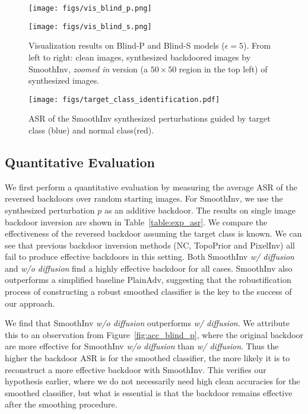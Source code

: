 \documentclass[10pt,twocolumn,letterpaper]{article}
\begin{document}
\begin{figure*}[htbp]
\centering 
        \begin{minipage}[]{0.495\linewidth}
        {\texttt{[image: figs/vis\_blind\_p.png]}}
        \end{minipage}
        \begin{minipage}[]{0.495\linewidth}
        {\texttt{[image: figs/vis\_blind\_s.png]}}
        \end{minipage}
    \caption{Visualization results on Blind-P and Blind-S models ($\epsilon=5$). From left to right: clean images, synthesized backdoored images by SmoothInv, \textit{zoomed in} version (a $50\times 50$ region in the top left) of synthesized images.}
    \label{fig:vis_exp_blind}
\end{figure*}


\begin{figure}[htbp]
\centering 
    \texttt{[image: figs/target\_class\_identification.pdf]}
    \caption{ASR of the SmoothInv synthesized perturbations guided by target class (blue) and normal class(red).}
    \label{fig:class_identification}
\end{figure}
\subsection{Quantitative Evaluation}\label{quantitative_evaluation} 
We first perform a quantitative evaluation by measuring the average ASR of the reversed backdoors over random starting images. For SmoothInv, we use the synthesized perturbation $p$ as an additive backdoor. The results on single image backdoor inversion are shown in Table~\ref{table:exp_asr}. We compare the effectiveness of the reversed backdoor assuming the target class is known. We can see that previous backdoor inversion methods (NC, TopoPrior and PixelInv) all fail to produce effective backdoors in this setting.  Both SmoothInv \textit{w/ diffusion} and \textit{w/o diffusion} find a highly effective backdoor for all cases. SmoothInv also outperforms a simplified baseline PlainAdv, suggesting that the robustification process of constructing a robust smoothed classifier is the key to the success of our approach. 

We find that SmoothInv \textit{w/o diffusion} outperforms \textit{w/ diffusion}. We attribute this to an observation from Figure~\ref{fig:acc_blind_p}, where the original backdoor are more effective for SmoothInv \textit{w/o diffusion} than \textit{w/ diffusion}. Thus the higher the backdoor ASR is for the smoothed classifier, the more likely it is to reconstruct a more effective backdoor with SmoothInv. This verifies our hypothesis earlier, where we do not necessarily need high clean accuracies for the smoothed classifier, but what is essential is that the backdoor remains effective after the smoothing procedure.
\end{document}

